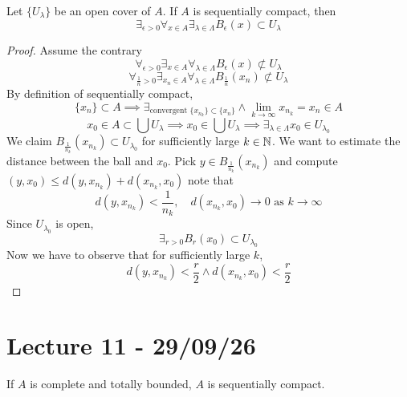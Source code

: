 \documentclass[11pt]{article}
\begin{document}
\begin{lemma}
    Let $\{U_\lambda\}$ be an open cover of $A$. If $A$ is sequentially compact, then 
    \[
        \exists_{\epsilon>0} \forall_{x \in A} \exists_{\lambda \in \Lambda} B_{\epsilon}(x) \subset U_{\lambda}
    \]
\end{lemma}
\begin{proof}
    Assume the contrary
    \[
        \forall_{\epsilon>0}\exists_{x \in A}\forall_{\lambda \in \Lambda} B_\epsilon(x) \not \subset U_{\lambda}
    \]
    \[
        \forall_{\frac{1}{n}>0}\exists_{x_n \in A}\forall_{\lambda \in \Lambda} B_{\frac{1}{n}}(x_n) \not \subset U_{\lambda}
    \]
    By definition of sequentially compact,
    \[
        \{x_n\} \subset A \implies \exists_{\text{convergent }\{x_{n_k}\} \subset \{x_n\}} \land \lim_{k \to \infty} x_{n_k} = x_n \in A
    \]
    \[
        x_0 \in A \subset \bigcup U_{\lambda} \implies x_0 \in \bigcup U_\lambda \implies \exists_{\lambda\in\Lambda}x_0 \in U_{\lambda_0}
    \]
    We claim $B_{\frac{1}{n_k}}(x_{n_k}) \subset U_{\lambda_0}$ for sufficiently large $k \in \mathbb{N}$. 
    We want to estimate the distance between the ball and $x_0$. Pick $y \in B_{\frac{1}{n_k}}(x_{n_k})$ and compute $(y, x_0) \le d(y,x_{n_k}) + d(x_{n_k}, x_0)$
    note that
    \[
        d(y,x_{n_k}) < \frac{1}{n_k}, \quad d(x_{n_k}, x_0) \rightarrow 0 \text{ as } k \rightarrow \infty
    \]
    Since $U_{\lambda_0}$ is open, 
    \[
        \exists_{r> 0 } B_r(x_0) \subset U_{\lambda_0}
    \]
    Now we have to observe that for sufficiently large $k$, 
    \[
        d(y,x_{n_k}) < \frac{r}{2} \land d(x_{n_k}, x_0) < \frac{r}{2}
    \]
    
\end{proof}

\section{Lecture 11 - 29/09/26}
\begin{theorem}[7.1]
    If $A$ is complete and totally bounded, $A$ is sequentially compact.
\end{theorem}
\end{document}
